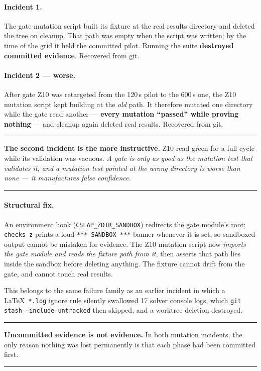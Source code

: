 \documentclass[11pt,a4paper]{article}
\newenvironment{keybox}
  {\par\medskip\noindent\rule{\linewidth}{0.9pt}\par\nobreak\smallskip\ignorespaces}
  {\par\smallskip\nobreak\noindent\rule{\linewidth}{0.9pt}\par\medskip}
\begin{document}
\paragraph{Incident 1.} The gate-mutation script built its fixture at the real
results directory and deleted the tree on cleanup. That path was empty when the
script was written; by the time of the grid it held the committed pilot.
Running the suite \textbf{destroyed committed evidence}. Recovered from git.

\paragraph{Incident 2 --- worse.} After gate Z10 was retargeted from the 120\,s
pilot to the 600\,s one, the Z10 mutation script kept building at the \emph{old}
path. It therefore mutated one directory while the gate read another ---
\textbf{every mutation ``passed'' while proving nothing} --- and cleanup again
deleted real results. Recovered from git.

\begin{keybox}
\textbf{The second incident is the more instructive.} Z10 read green for a full
cycle while its validation was vacuous. \emph{A gate is only as good as the
mutation test that validates it, and a mutation test pointed at the wrong
directory is worse than none --- it manufactures false confidence.}
\end{keybox}

\paragraph{Structural fix.} An environment hook
(\texttt{CSLAP\_ZDIR\_SANDBOX}) redirects the gate module's root;
\texttt{checks\_z} prints a loud \texttt{*** SANDBOX ***} banner whenever it is
set, so sandboxed output cannot be mistaken for evidence. The Z10 mutation
script now \emph{imports the gate module and reads the fixture path from it},
then asserts that path lies inside the sandbox before deleting anything. The
fixture cannot drift from the gate, and cannot touch real results.

This belongs to the same failure family as an earlier incident in which a
\LaTeX\ \texttt{*.log} ignore rule silently swallowed 17 solver console logs,
which \texttt{git stash --include-untracked} then skipped, and a worktree
deletion destroyed.

\begin{keybox}
\textbf{Uncommitted evidence is not evidence.} In both mutation incidents, the
only reason nothing was lost permanently is that each phase had been committed
first.
\end{keybox}
\end{document}
